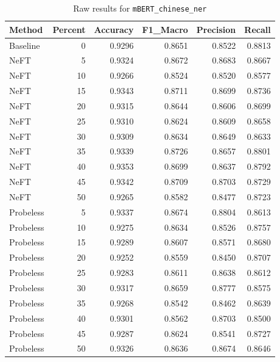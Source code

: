 \documentclass[12pt]{article}
\begin{document}
\begin{table}[H]
\centering
\caption{Raw results for \texttt{mBERT\_chinese\_ner}}
\label{tab:mbert-chinese-ner}
\begin{tabular}{lrrrrr}
\toprule
Method & Percent & Accuracy & F1\_Macro & Precision & Recall \\
\midrule
Baseline & 0 & 0.9296 & 0.8651 & 0.8522 & 0.8813 \\
NeFT & 5 & 0.9324 & 0.8672 & 0.8683 & 0.8667 \\
NeFT & 10 & 0.9266 & 0.8524 & 0.8520 & 0.8577 \\
NeFT & 15 & 0.9343 & 0.8711 & 0.8699 & 0.8736 \\
NeFT & 20 & 0.9315 & 0.8644 & 0.8606 & 0.8699 \\
NeFT & 25 & 0.9310 & 0.8624 & 0.8609 & 0.8658 \\
NeFT & 30 & 0.9309 & 0.8634 & 0.8649 & 0.8633 \\
NeFT & 35 & 0.9339 & 0.8726 & 0.8657 & 0.8801 \\
NeFT & 40 & 0.9353 & 0.8699 & 0.8637 & 0.8792 \\
NeFT & 45 & 0.9342 & 0.8709 & 0.8703 & 0.8729 \\
NeFT & 50 & 0.9265 & 0.8582 & 0.8477 & 0.8723 \\
Probeless & 5 & 0.9337 & 0.8674 & 0.8804 & 0.8613 \\
Probeless & 10 & 0.9275 & 0.8634 & 0.8526 & 0.8757 \\
Probeless & 15 & 0.9289 & 0.8607 & 0.8571 & 0.8680 \\
Probeless & 20 & 0.9252 & 0.8559 & 0.8450 & 0.8707 \\
Probeless & 25 & 0.9283 & 0.8611 & 0.8638 & 0.8612 \\
Probeless & 30 & 0.9317 & 0.8659 & 0.8777 & 0.8575 \\
Probeless & 35 & 0.9268 & 0.8542 & 0.8462 & 0.8639 \\
Probeless & 40 & 0.9301 & 0.8562 & 0.8703 & 0.8500 \\
Probeless & 45 & 0.9287 & 0.8624 & 0.8541 & 0.8727 \\
Probeless & 50 & 0.9326 & 0.8636 & 0.8674 & 0.8646 \\
\bottomrule
\end{tabular}
\end{table}
\end{document}
